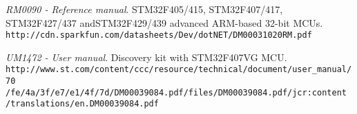 \begin{thebibliography}{9}

\textit{RM0090 - Reference manual}.
STM32F405/415, STM32F407/417, STM32F427/437 andSTM32F429/439 advanced ARM-based 32-bit MCUs.
\\\texttt{http://cdn.sparkfun.com/datasheets/Dev/dotNET/DM00031020RM.pdf}
 
\textit{UM1472 - User manual}.
Discovery kit with STM32F407VG MCU.
\\\texttt{http://www.st.com/content/ccc/resource/technical/document/user\_manual/70}
\\\texttt{/fe/4a/3f/e7/e1/4f/7d/DM00039084.pdf/files/DM00039084.pdf/jcr:content}
\\\texttt{/translations/en.DM00039084.pdf}
\end{thebibliography}